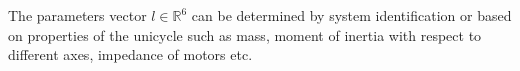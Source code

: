 \documentclass[letterpaper, 10 pt, conference]{ieeeconf}  %
\begin{document}
%

%

The parameters vector ${l \in \mathds{R}^6}$ can be determined by system identification or based on properties of the unicycle such as mass, moment of inertia with respect to different axes, impedance of motors etc.

\end{document}

